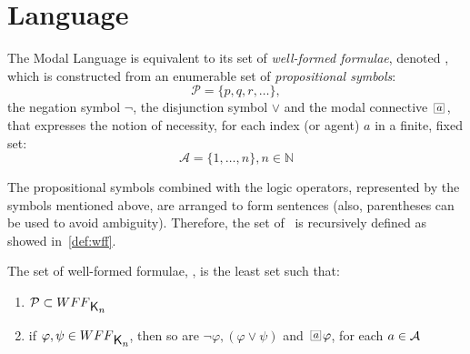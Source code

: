 \section{Language}
\label{sec:language}

The Modal Language  is equivalent to its set of \emph{well-formed
formulae}, denoted \wff, which is constructed from an enumerable set of
\emph{propositional symbols}:
\begin{equation}
    \label{eq:prop_symb}
    \mathcal{P} = \{p, q, r, \ldots\},
\end{equation}
the negation symbol $\neg$, the disjunction symbol $\lor$ and the modal
connective $\nec{a}$, that expresses the notion of necessity, for each index (or
agent) $a$ in a finite, fixed set:
\begin{equation}
    \label{eq:agents}
    \mathcal{A} = \{1, \ldots, n\}, n \in
    \mathbb{N}
\end{equation}

The propositional symbols combined with the logic operators, represented by the
symbols mentioned above, are arranged to form sentences (also, parentheses can
be used to avoid ambiguity). Therefore, the set of \wff~is recursively defined
as showed in~\ref{def:wff}.

\begin{definition}
\label{def:wff}
    The set of well-formed formulae, \wff, is the least set such that:
    \begin{enumerate}
        \item $\mathcal{P} \subset \wff$
            \vspace{.2ex}
        \item if $\varphi, \psi \in \wff$, then so are $\neg \varphi, (\varphi
            \lor \psi)$ and $\nec{a} \varphi$, for each $a \in {\mathcal{A}}$
    \end{enumerate}
\end{definition}

